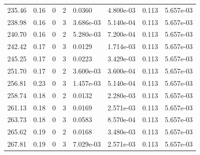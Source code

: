 \documentclass[preview]{standalone}
\begin{document}
{{{\begin{tabular}{L{1.2cm}C{1.2cm} C{0.3cm}C{0.5cm} C{1.4cm}C{1.4cm} C{1.4cm}C{1.4cm}}
  235.46  &  0.16  & 0     &  2 &  0.0360  & 4.800e-03  & 0.113 &  5.657e-03   \\ 
  238.98  &  0.16  & 0     &  3 &  3.686e-03  & 5.140e-04  & 0.113 &  5.657e-03   \\ 
  240.70  &  0.16  & 0     &  2 &  5.280e-03  & 7.200e-04  & 0.113 &  5.657e-03   \\ 
  242.42  &  0.17  & 0     &  3 &  0.0129  & 1.714e-03  & 0.113 &  5.657e-03   \\ 
  245.25  &  0.17  & 0     &  3 &  0.0223  & 3.429e-03  & 0.113 &  5.657e-03   \\ 
  251.70  &  0.17  & 0     &  2 &  3.600e-03  & 3.600e-04  & 0.113 &  5.657e-03   \\ 
  256.81  &  0.23  & 0     &  3 &  1.457e-03  & 5.140e-04  & 0.113 &  5.657e-03   \\ 
  258.74  &  0.18  & 0     &  2 &  0.0132  & 2.280e-03  & 0.113 &  5.657e-03   \\ 
  261.13  &  0.18  & 0     &  3 &  0.0169  & 2.571e-03  & 0.113 &  5.657e-03   \\ 
  263.73  &  0.18  & 0     &  3 &  0.0583  & 8.570e-04  & 0.113 &  5.657e-03   \\ 
  265.62  &  0.19  & 0     &  2 &  0.0168  & 3.480e-03  & 0.113 &  5.657e-03   \\ 
  267.81  &  0.19  & 0     &  3 &  7.029e-03  & 2.571e-03  & 0.113 &  5.657e-03   \\ 
\hline 
\end{tabular} 

}}}
\end{document}
